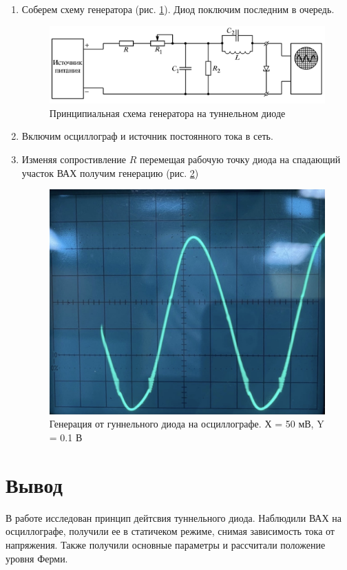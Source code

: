 \documentclass[a4paper]{article}
\begin{document}
\begin{enumerate}
    \item Соберем схему генератора (рис. \ref{gen}). Диод поключим последним в очередь.

        \begin{figure}[h]
            \begin{center}
                \includegraphics[scale = 0.8]{gen.png}
                \caption{Принципиальная схема генератора на туннельном диоде}
                \label{gen}
            \end{center}
        \end{figure}

    \item Включим осциллограф и источник постоянного тока в сеть.
    \item Изменяя сопростивление $R$ перемещая рабочую точку диода на спадающий участок ВАХ получим генерацию (рис. \ref{gen1})

    \begin{figure}[H]
        \begin{center}
            \includegraphics[scale = 0.2]{gen1.jpg}
            \caption{Генерация от гуннельного диода на осциллографе. Х = 50 мВ, Y = 0.1 В}
            \label{gen1}
        \end{center}
    \end{figure}

\end{enumerate}


\section{Вывод}
В работе исследован принцип дейтсвия туннельного диода. Наблюдили ВАХ на осциллографе, получили ее в статичеком режиме, снимая зависимость тока от напряжения. Также 
получили основные параметры и рассчитали положение уровня Ферми.
\end{document}
